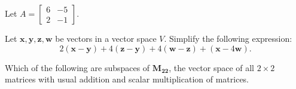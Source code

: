 \documentclass[addpoints, 12pt]{exam}%
\theoremstyle{definition}
\begin{document}
\begin{questions}

\question
Let $A = \begin{bmatrix} 6 & -5 \\ 2 & -1 \end{bmatrix}$.

\newpage 

\phantom{2}

\newpage

\question[10]

Let $\mathbf{x}, \mathbf{y}, \mathbf{z}, \mathbf{w}$ be vectors in a vector space $V$. Simplify the following expression: 
  $$
  2(\mathbf{x} - \mathbf{y}) + 4(\mathbf{z} - \mathbf{y}) + 4(\mathbf{w} - \mathbf{z}) + (\mathbf{x} - 4\mathbf{w}) .
  $$


\newpage 

\question

Which of the following are subspaces of $\mathbf{M_{22}}$, the vector space of all $2 \times 2$ matrices with usual addition and scalar multiplication of matrices.


\newpage 


\end{questions}
\end{document}
